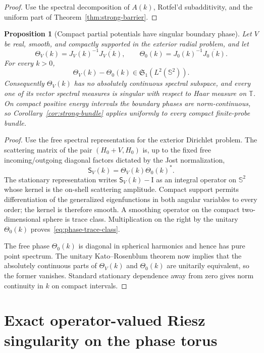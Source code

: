 \documentclass[11pt]{article}
\newtheorem{proposition}[theorem]{Proposition}
\theoremstyle{remark}
\newcommand{\T}{\mathbb T}
\newcommand{\Id}{\mathrm I}
\begin{document}
\begin{proof}
Use the spectral decomposition of $A(k)$, Rotfel'd subadditivity, and the
uniform part of Theorem~\ref{thm:strong-barrier}.
\end{proof}

\begin{proposition}[Compact partial potentials have singular boundary phase]
\label{rem:phase-criterion}
Let $V$ be real, smooth, and compactly supported in the exterior radial
problem, and let
\[
 \Theta_V(k)=J_V(k)^{-1}\overline{J_V(k)},\qquad
 \Theta_0(k)=J_0(k)^{-1}\overline{J_0(k)}.
\]
For every $k>0$,
\begin{equation}
 \Theta_V(k)-\Theta_0(k)\in\mathfrak S_1(L^2(\mathbb S^2)).
 \label{eq:phase-trace-class}
\end{equation}
Consequently $\Theta_V(k)$ has no absolutely continuous spectral subspace,
and every one of its vector spectral measures is singular with respect to
Haar measure on $\T$.  On compact positive energy intervals the boundary
phases are norm-continuous, so Corollary~\ref{cor:strong-bundle} applies
uniformly to every compact finite-probe bundle.
\end{proposition}

\begin{proof}
Use the free spectral representation for the exterior Dirichlet problem.
The scattering matrix of the pair $(H_0+V,H_0)$ is, up to the fixed free
incoming/outgoing diagonal factors dictated by the Jost normalization,
\[
 \mathsf S_V(k)=\Theta_V(k)\Theta_0(k)^*.
\]
The stationary representation writes
$\mathsf S_V(k)-\Id$ as an integral operator on $\mathbb S^2$ whose kernel is
the on-shell scattering amplitude.  Compact support permits differentiation
of the generalized eigenfunctions in both angular variables to every order;
the kernel is therefore smooth.  A smoothing operator on the compact
two-dimensional sphere is trace class.  Multiplication on the right by the
unitary $\Theta_0(k)$ proves~\eqref{eq:phase-trace-class}.

The free phase $\Theta_0(k)$ is diagonal in spherical harmonics and hence has
pure point spectrum.  The unitary Kato--Rosenblum theorem now implies that
the absolutely continuous parts of $\Theta_V(k)$ and $\Theta_0(k)$ are
unitarily equivalent, so the former vanishes.  Standard stationary
dependence away from zero gives norm continuity in $k$ on compact intervals.
\end{proof}

\section{Exact operator-valued Riesz singularity on the phase torus}
\end{document}
